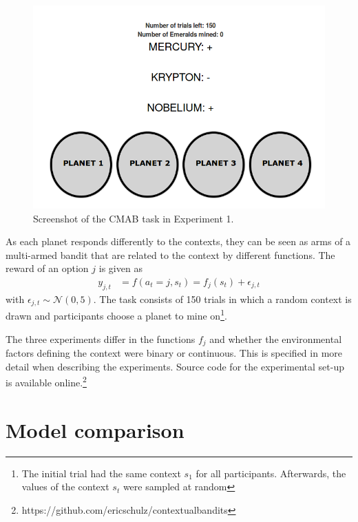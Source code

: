 \documentclass[a4paper,natbib]{apa6}
\begin{document}
\begin{figure}[h!]
\centering
\includegraphics[scale=0.3]{figure21.png}
\caption{Screenshot of the CMAB task in Experiment 1.}
\label{fig:screenshot}
\end{figure}

As each planet responds differently to the contexts, they can be seen as arms of a multi-armed bandit that are related to the context by different functions. The reward of an option $j$ is given as
%
\begin{align}
y_{j,t} &= f(a_t=j, s_t) = f_j(s_t) + \epsilon_{j,t}
\end{align}
%
with $\epsilon_{j,t} \sim \mathcal{N}(0,5)$. The task consists of 150 trials in which a random context is drawn and participants choose a planet to mine on\footnote{The initial trial had the same context $s_1$ for all participants. Afterwards, the values of the context $s_t$ were sampled at random}. 

The three experiments differ in the functions $f_j$ and whether the environmental factors defining the context were binary or continuous. This is specified in more detail when describing the experiments. Source code for the experimental set-up is available online.\footnote{https://github.com/ericschulz/contextualbandits}

\section{Model comparison}
\end{document}
